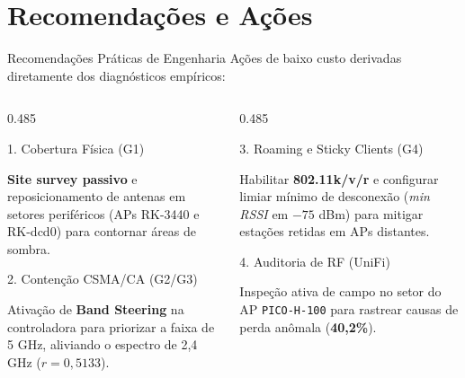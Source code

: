 \documentclass[10pt,brazil]{beamer}
\begin{document}
    \section{Recomendações e Ações}
    \begin{frame}[t]{Recomendações Práticas de Engenharia}
        \vspace{0.1cm}
        Ações de baixo custo derivadas diretamente dos diagnósticos empíricos:
        \vspace{0.25cm}
        \begin{columns}[t]
            \begin{column}{0.485\textwidth}
                \begin{block}{1. Cobertura Física (G1)}
                    \begin{minipage}[t][1.5cm][t]{\linewidth}
                        \scriptsize
                        \textbf{Site survey passivo} e reposicionamento de antenas em setores periféricos (APs RK-3440 e RK-dcd0) para contornar áreas de sombra.
                    \end{minipage}
                \end{block}
                \vspace{0.25cm}
                \begin{block}{2. Contenção CSMA/CA (G2/G3)}
                    \begin{minipage}[t][1.5cm][t]{\linewidth}
                        \scriptsize
                        Ativação de \textbf{Band Steering} na controladora para priorizar a faixa de 5 GHz, aliviando o espectro de 2,4 GHz ($r = 0,5133$).
                    \end{minipage}
                \end{block}
            \end{column}
            \begin{column}{0.485\textwidth}
                \begin{block}{3. Roaming e Sticky Clients (G4)}
                    \begin{minipage}[t][1.5cm][t]{\linewidth}
                        \scriptsize
                        Habilitar \textbf{802.11k/v/r} e configurar limiar mínimo de desconexão (\textit{min RSSI} em $-75$ dBm) para mitigar estações retidas em APs distantes.
                    \end{minipage}
                \end{block}
                \vspace{0.25cm}
                \begin{block}{4. Auditoria de RF (UniFi)}
                    \begin{minipage}[t][1.5cm][t]{\linewidth}
                        \scriptsize
                        Inspeção ativa de campo no setor do AP \texttt{PICO-H-100} para rastrear causas de perda anômala (\textbf{40,2\%}).
                    \end{minipage}
                \end{block}
            \end{column}
        \end{columns}
    \end{frame}
\end{document}

